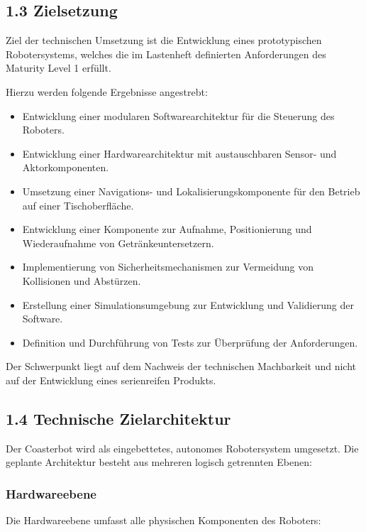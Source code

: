 \documentclass[
]{article}
\providecommand{\tightlist}{%
  \setlength{\itemsep}{0pt}\setlength{\parskip}{0pt}}
\begin{document}
\subsection{1.3 Zielsetzung}\label{zielsetzung}

Ziel der technischen Umsetzung ist die Entwicklung eines prototypischen
Robotersystems, welches die im Lastenheft definierten Anforderungen des
Maturity Level 1 erfüllt.

Hierzu werden folgende Ergebnisse angestrebt:

\begin{itemize}
\tightlist
\item
  Entwicklung einer modularen Softwarearchitektur für die Steuerung des
  Roboters.
\item
  Entwicklung einer Hardwarearchitektur mit austauschbaren Sensor- und
  Aktorkomponenten.
\item
  Umsetzung einer Navigations- und Lokalisierungskomponente für den
  Betrieb auf einer Tischoberfläche.
\item
  Entwicklung einer Komponente zur Aufnahme, Positionierung und
  Wiederaufnahme von Getränkeuntersetzern.
\item
  Implementierung von Sicherheitsmechanismen zur Vermeidung von
  Kollisionen und Abstürzen.
\item
  Erstellung einer Simulationsumgebung zur Entwicklung und Validierung
  der Software.
\item
  Definition und Durchführung von Tests zur Überprüfung der
  Anforderungen.
\end{itemize}

Der Schwerpunkt liegt auf dem Nachweis der technischen Machbarkeit und
nicht auf der Entwicklung eines serienreifen Produkts.

\subsection{1.4 Technische
Zielarchitektur}\label{technische-zielarchitektur}

Der Coasterbot wird als eingebettetes, autonomes Robotersystem
umgesetzt. Die geplante Architektur besteht aus mehreren logisch
getrennten Ebenen:

\subsubsection{Hardwareebene}\label{hardwareebene}

Die Hardwareebene umfasst alle physischen Komponenten des Roboters:
\end{document}
